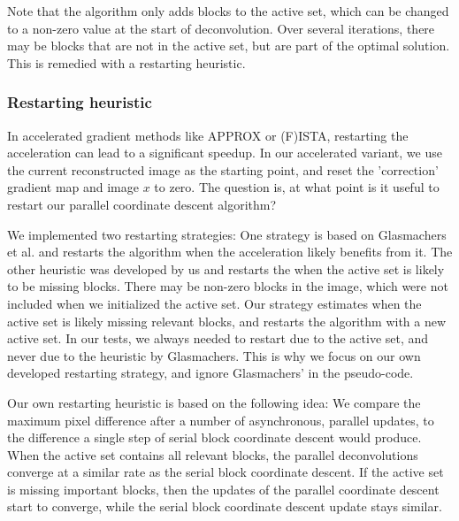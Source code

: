 Note that the algorithm only adds blocks to the active set, which can be changed to a non-zero value at the start of deconvolution. Over several iterations, there may be blocks that are not in the active set, but are part of the optimal solution. This is remedied with a restarting heuristic.


\subsubsection*{Restarting heuristic}
In accelerated gradient methods like APPROX or (F)ISTA, restarting the acceleration can lead to a significant speedup\cite{fercoq2016restarting}. In our accelerated variant, we use the current reconstructed image as the starting point, and reset the 'correction' gradient map and image $x$ to zero. The question is, at what point is it useful to restart our parallel coordinate descent algorithm?

We implemented two restarting strategies: One strategy is based on Glasmachers et al.\cite{glasmachers2014coordinate} and restarts the algorithm when the acceleration likely benefits from it. The other heuristic was developed by us and restarts the when the active set is likely to be missing blocks. There may be non-zero blocks in the image, which were not included when we initialized the active set. Our strategy estimates when the active set is likely missing relevant blocks, and restarts the algorithm with a new active set. In our tests, we always needed to restart due to the active set, and never due to the heuristic by Glasmachers. This is why we focus on our own developed restarting strategy, and ignore Glasmachers' in the pseudo-code.

Our own restarting heuristic is based on the following idea: We compare the maximum pixel difference after a number of asynchronous, parallel updates, to the difference a single step of serial block coordinate descent would produce. When the active set contains all relevant blocks, the parallel deconvolutions converge at a similar rate as the serial block coordinate descent. If the active set is missing important blocks, then the updates of the parallel coordinate descent start to converge, while the serial block coordinate descent update stays similar.

